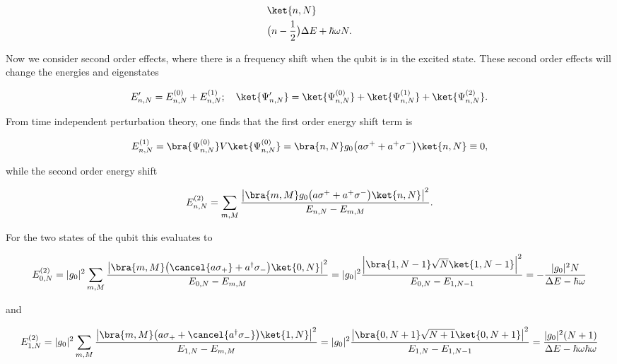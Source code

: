 \begin{equation}\label{secStates}
  \begin{aligned}
    &\ket{n,N}\\
    &\big(n-\frac{1}{2}\big)\Delta E + \hbar\omega N.
  \end{aligned}
\end{equation}

\noindent Now we consider second order effects, where there is a frequency shift when the qubit is in the excited state. These
second order effects will change the energies and eigenstates

\begin{equation}\label{secEi}
  E'_{n,N} = E_{n,N}^{(0)} + E_{n,N}^{(1)};\quad \ket{\Psi'_{n,N}}=\ket{\Psi^{(0)}_{n,N}}+\ket{\Psi^{(1)}_{n,N}}+\ket{\Psi^{(2)}_{n,N}}.
\end{equation} 


\begin{figure}[h]
   
\end{figure}

\noindent From time independent perturbation theory, one finds that the first order energy shift term is

\begin{equation}\label{sec1st}
  E_{n,N}^{(1)} = \bra{\Psi^{(0)}_{n,N}}V\ket{\Psi^{(0)}_{n,N}} = \bra{n,N}g_0\big(a\sigma^{+}+a^{+}\sigma^{-}\big)\ket{n,N} \equiv 0,
\end{equation}

\noindent while the second order energy shift

\begin{equation}\label{sec2nd}
  E_{n,N}^{(2)} = \sum_{m,M}\frac{\left|\bra{m,M}g_0\big(a\sigma^{+}+a^{+}\sigma^{-}\big)\ket{n,N}\right|^2}{E_{n,N}-E_{m,M}}.
\end{equation}

\noindent For the two states of the qubit this evaluates to

\begin{equation}\label{sec0}
  E_{0,N}^{(2)} = |g_0|^2\sum_{m,M}\frac{\left|\bra{m,M}\big(\cancel{a\sigma_{+}}+a^{\dagger}\sigma_{-}\big)\ket{0,N}\right|^2}{E_{0,N}-E_{m,M}}= |g_0|^2\frac{\left|\bra{1,N-1}\sqrt{N}\ket{1,N-1}\right|^2}{E_{0,N}-E_{1,N-1}} = -\frac{|g_0|^2N}{\Delta E - \hbar\omega}
\end{equation}

\noindent and

\begin{equation}\label{sec1}
  E_{1,N}^{(2)} = |g_0|^2\sum_{m,M}\frac{\left|\bra{m,M}\big({a\sigma_{+}}+\cancel{a^{\dagger}\sigma_{-}}\big)\ket{1,N}\right|^2}{E_{1,N}-E_{m,M}}= |g_0|^2\frac{\left|\bra{0,N+1}\sqrt{N+1}\ket{0,N+1}\right|^2}{E_{1,N}-E_{1,N-1}} = \frac{|g_0|^2(N+1)}{\Delta E - \hbar\omega \hbar\omega}
\end{equation}

